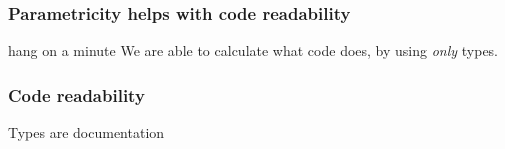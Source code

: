\begin{frame}
\frametitle{Parametricity helps with code readability}
\begin{block}{hang on a minute}
We are able to calculate what code does, by using \emph{only} types.
\end{block}
\end{frame}

\begin{frame}
\frametitle{Code readability}
\begin{center}
Types are documentation
\end{center}
\end{frame}
